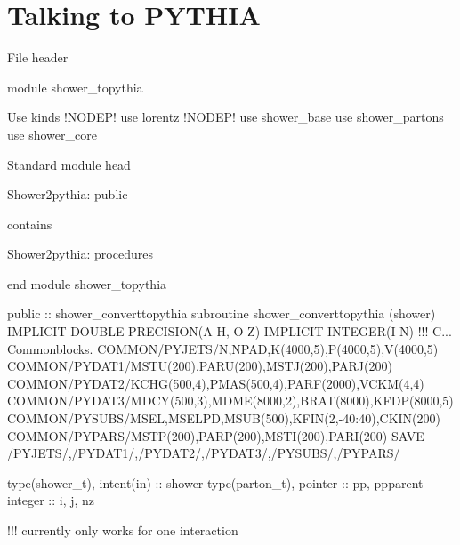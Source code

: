 \section{Talking to PYTHIA}
\nwenddocs{}\endmoddef
\LA{}File header\RA{}

module shower_topythia

\LA{}Use kinds\RA{} !NODEP!
  use lorentz !NODEP!
  use shower_base
  use shower_partons
  use shower_core

\LA{}Standard module head\RA{}

\LA{}Shower2pythia: public\RA{}

contains

\LA{}Shower2pythia: procedures\RA{}

  end module shower_topythia

\eatline
\nwendcode{}\nwdocspar
\nwenddocs{}\endmoddef
  public :: shower_converttopythia
\nwendcode{}\nwdocspar
\nwenddocs{}\endmoddef
  subroutine shower_converttopythia (shower)
    IMPLICIT DOUBLE PRECISION(A-H, O-Z)
    IMPLICIT INTEGER(I-N)
    !!!    C...  Commonblocks.
    COMMON/PYJETS/N,NPAD,K(4000,5),P(4000,5),V(4000,5)
    COMMON/PYDAT1/MSTU(200),PARU(200),MSTJ(200),PARJ(200)
    COMMON/PYDAT2/KCHG(500,4),PMAS(500,4),PARF(2000),VCKM(4,4)
    COMMON/PYDAT3/MDCY(500,3),MDME(8000,2),BRAT(8000),KFDP(8000,5)
    COMMON/PYSUBS/MSEL,MSELPD,MSUB(500),KFIN(2,-40:40),CKIN(200)
    COMMON/PYPARS/MSTP(200),PARP(200),MSTI(200),PARI(200)
    SAVE /PYJETS/,/PYDAT1/,/PYDAT2/,/PYDAT3/,/PYSUBS/,/PYPARS/

    type(shower_t), intent(in) :: shower
    type(parton_t), pointer :: pp, ppparent
    integer :: i, j, nz

    !!! currently only works for one interaction

